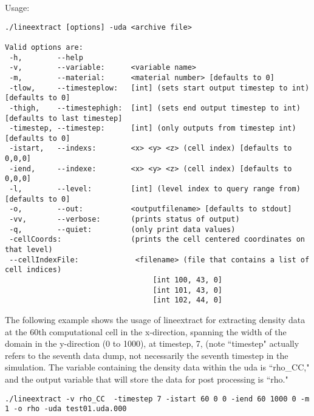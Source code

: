 Usage: \begin{Verbatim}[fontsize=\footnotesize]
./lineextract [options] -uda <archive file>

Valid options are:
 -h,        --help
 -v,        --variable:      <variable name>
 -m,        --material:      <material number> [defaults to 0]
 -tlow,     --timesteplow:   [int] (sets start output timestep to int) [defaults to 0]
 -thigh,    --timestephigh:  [int] (sets end output timestep to int) [defaults to last timestep]
 -timestep, --timestep:      [int] (only outputs from timestep int) [defaults to 0]
 -istart,   --indexs:        <x> <y> <z> (cell index) [defaults to 0,0,0]
 -iend,     --indexe:        <x> <y> <z> (cell index) [defaults to 0,0,0]
 -l,        --level:         [int] (level index to query range from) [defaults to 0]
 -o,        --out:           <outputfilename> [defaults to stdout]
 -vv,       --verbose:       (prints status of output)
 -q,        --quiet:         (only print data values)
 -cellCoords:                (prints the cell centered coordinates on that level)
 --cellIndexFile:             <filename> (file that contains a list of cell indices)
                                  [int 100, 43, 0]
                                  [int 101, 43, 0]
                                  [int 102, 44, 0]
\end{Verbatim}

The following example shows the usage of lineextract for extracting density data at the 60th computational cell in the x-direction, spanning the width of the domain in the y-direction (0 to 1000), at timestep, 7, (note ``timestep" actually 
refers to the seventh data dump, not necessarily the seventh timestep in the 
simulation. The variable containing the density data within the uda is ``rho\_CC," and the output variable that will store the data for post processing is ``rho."
\begin{Verbatim}[fontsize=\footnotesize]
./lineextract -v rho_CC  -timestep 7 -istart 60 0 0 -iend 60 1000 0 -m 1 -o rho -uda test01.uda.000
\end{Verbatim}



